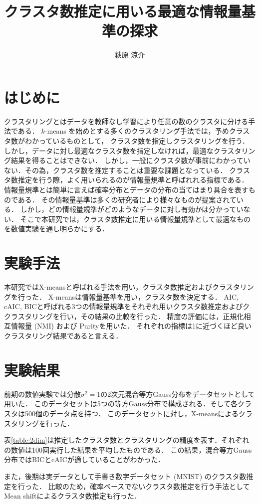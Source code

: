 \documentclass[twocolumn, 10.5pt,a4j]{ltjsarticle}
\author{萩原 涼介}
\title{クラスタ数推定に用いる最適な情報量基準の探求}
\def\tableref#1{表\ref{#1}}
\begin{document}
\maketitle

\section{はじめに}

クラスタリングとはデータを教師なし学習により任意の数のクラスタに分ける手法である．
$k$-means を始めとする多くのクラスタリング手法では，予めクラスタ数がわかっているものとして，
クラスタ数を指定しクラスタリングを行う．しかし，データに対し最適なクラスタ数を指定しなければ，最適なクラスタリング結果を得ることはできない．
しかし，一般にクラスタ数が事前にわかっていない．その為，クラスタ数を推定することは重要な課題となっている．
クラスタ数推定を行う際，よく用いられるのが情報量規準と呼ばれれる指標である．
情報量規準とは簡単に言えば確率分布とデータの分布の当てはまり具合を表すものである．
その情報量基準は多くの研究者により様々なものが提案されている．
しかし，どの情報量規準がどのようなデータに対し有効かは分かっていない．
そこで本研究では，クラスタ数推定に用いる情報量規準として最適なものを数値実験を通し明らかにする．

\section{実験手法}
本研究ではX-meansと呼ばれる手法を用い，クラスタ数推定およびクラスタリングを行った．
X-meansは情報量基準を用い，クラスタ数を決定する．
AIC, cAIC, BICと呼ばれる3つの情報量規準をそれぞれ用いクラスタ数推定およびククラスタリングを行い，その結果の比較を行った．
精度の評価には，正規化相互情報量 (NMI) および Purityを用いた．
それぞれの指標は1に近づくほど良いクラスタリング結果であると言える．

\section{実験結果}
前期の数値実験では分散$\sigma^2 = 1$の2次元混合等方Gauss分布をデータセットとして用いた．
このデータセットは5つの等方Gauss分布で構成される．そして各クラスタは500個のデータ点を持つ．
このデータセットに対し，X-meansによるクラスタリングを行った．

\tableref{table:2dim}は推定したクラスタ数とクラスタリングの精度を表す．それぞれの数値は100回実行した結果を平均したものである．
この結果，混合等方Gauss分布ではBICとcAICが適していることがわかった．

また，後期は実データとして手書き数字データセット (MNIST) のクラスタ数推定を行った．
比較のため，確率ベースでないクラスタ数推定を行う手法としてMean shiftによるクラスタ数推定も行った．
\end{document}
